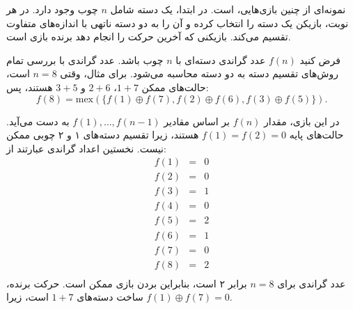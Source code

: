 نمونه‌ای از چنین بازی‌هایی،  است. در ابتدا، یک دسته شامل $n$ چوب وجود دارد. در هر نوبت، بازیکن یک دسته را انتخاب کرده و آن را به دو دسته ناتهی با اندازه‌های متفاوت تقسیم می‌کند. بازیکنی که آخرین حرکت را انجام دهد برنده بازی است.

فرض کنید $f(n)$ عدد گراندی دسته‌ای با $n$ چوب باشد. عدد گراندی با بررسی تمام روش‌های تقسیم دسته به دو دسته محاسبه می‌شود. برای مثال، وقتی $n=8$ است، حالت‌های ممکن $1+7$، $2+6$ و $3+5$ هستند، پس:
\[f(8)=\textrm{mex}(\{f(1) \oplus f(7), f(2) \oplus f(6), f(3) \oplus f(5)\}).\]

در این بازی، مقدار $f(n)$ بر اساس مقادیر $f(1),\ldots,f(n-1)$ به دست می‌آید. حالت‌های پایه $f(1)=f(2)=0$ هستند، زیرا تقسیم دسته‌های ۱ و ۲ چوبی ممکن نیست. نخستین اعداد گراندی عبارتند از:
\[
\begin{array}{lcl}
f(1) & = & 0 \\
f(2) & = & 0 \\
f(3) & = & 1 \\
f(4) & = & 0 \\
f(5) & = & 2 \\
f(6) & = & 1 \\
f(7) & = & 0 \\
f(8) & = & 2 \\
\end{array}
\]
عدد گراندی برای $n=8$ برابر ۲ است، بنابراین بردن بازی ممکن است. حرکت برنده، ساخت دسته‌های $1+7$ است، زیرا $f(1) \oplus f(7) = 0$.